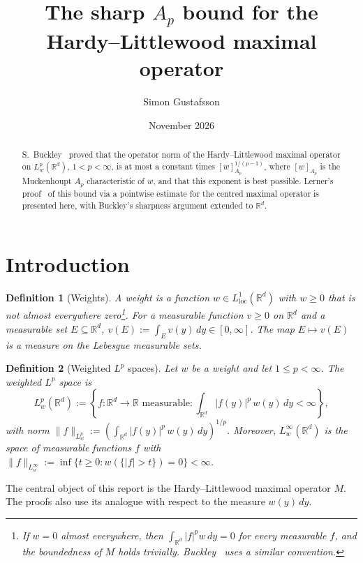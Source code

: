 \documentclass[12pt]{article}
\title{The sharp $A_p$ bound for the\\
       Hardy--Littlewood maximal operator\\[0.3em]}
\author{Simon Gustafsson}
\date{November 2026}
\newtheorem{definition}{Definition}
\begin{document}
\maketitle

\begin{abstract}
S.~Buckley~\cite{Buckley1993} proved that the operator norm of the Hardy--Littlewood maximal operator on $L^p_w(\mathbb{R}^d)$, $1<p<\infty$, is at most a constant times $[w]_{A_p}^{1/(p-1)}$, where $[w]_{A_p}$ is the Muckenhoupt $A_p$ characteristic of $w$, and that this exponent is best possible. Lerner's proof~\cite{Lerner2008} of this bound via a pointwise estimate for the centred maximal operator is presented here, with Buckley's sharpness argument extended to $\mathbb{R}^d$.
\end{abstract}

\section{Introduction}

\begin{definition}[Weights]\label{def:weight}
A \emph{weight} is a function $w \in L^1_{\mathrm{loc}}(\mathbb{R}^d)$ with $w \geq 0$ that is not almost everywhere zero\footnote{If $w = 0$ almost everywhere, then $\int_{\mathbb{R}^d} |f|^p w\,dy = 0$ for every measurable $f$, and the boundedness of $M$ holds trivially. Buckley~\cite[Section~1]{Buckley1993} uses a similar convention.}. For a measurable function $v \geq 0$ on $\mathbb{R}^d$ and a measurable set $E \subseteq \mathbb{R}^d$, $v(E) := \int_E v(y)\,dy \in [0,\infty]$. The map $E \mapsto v(E)$ is a measure on the Lebesgue measurable sets.
\end{definition}

\begin{definition}[Weighted $L^p$ spaces]\label{def:Lp}
Let $w$ be a weight and let $1 \le p < \infty$. The weighted $L^p$ space is
\[
  L^p_w(\mathbb{R}^d) := \left\{ f : \mathbb{R}^d \to \mathbb{R} \text{ measurable} : \int_{\mathbb{R}^d} |f(y)|^p\, w(y)\,dy < \infty \right\},
\]
with norm $\|f\|_{L^p_w} := \left( \int_{\mathbb{R}^d} |f(y)|^p\, w(y)\,dy \right)^{1/p}$. Moreover, $L^\infty_w(\mathbb{R}^d)$ is the space of measurable functions $f$ with $\|f\|_{L^\infty_w} := \inf\{ t \ge 0 : w(\{|f| > t\}) = 0 \} < \infty$.
\end{definition}

The central object of this report is the Hardy--Littlewood maximal operator $M$. The proofs also use its analogue with respect to the measure $w(y)\,dy$.
\end{document}

